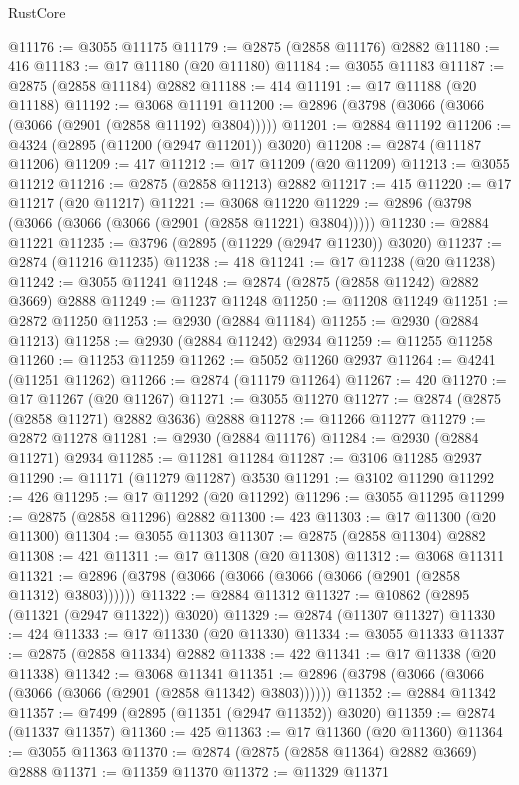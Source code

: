 \begin{lexlean}{RustCore}
\begin{coremodule}
@11176 := @3055 @11175
@11179 := @2875 (@2858 @11176) @2882
@11180 := 416
@11183 := @17 @11180 (@20 @11180)
@11184 := @3055 @11183
@11187 := @2875 (@2858 @11184) @2882
@11188 := 414
@11191 := @17 @11188 (@20 @11188)
@11192 := @3068 @11191
@11200 := @2896 (@3798 (@3066 (@3066 (@3066 (@2901 (@2858 @11192) @3804)))))
@11201 := @2884 @11192
@11206 := @4324 (@2895 (@11200 (@2947 @11201)) @3020)
@11208 := @2874 (@11187 @11206)
@11209 := 417
@11212 := @17 @11209 (@20 @11209)
@11213 := @3055 @11212
@11216 := @2875 (@2858 @11213) @2882
@11217 := 415
@11220 := @17 @11217 (@20 @11217)
@11221 := @3068 @11220
@11229 := @2896 (@3798 (@3066 (@3066 (@3066 (@2901 (@2858 @11221) @3804)))))
@11230 := @2884 @11221
@11235 := @3796 (@2895 (@11229 (@2947 @11230)) @3020)
@11237 := @2874 (@11216 @11235)
@11238 := 418
@11241 := @17 @11238 (@20 @11238)
@11242 := @3055 @11241
@11248 := @2874 (@2875 (@2858 @11242) @2882 @3669) @2888
@11249 := @11237 @11248
@11250 := @11208 @11249
@11251 := @2872 @11250
@11253 := @2930 (@2884 @11184)
@11255 := @2930 (@2884 @11213)
@11258 := @2930 (@2884 @11242) @2934
@11259 := @11255 @11258
@11260 := @11253 @11259
@11262 := @5052 @11260 @2937
@11264 := @4241 (@11251 @11262)
@11266 := @2874 (@11179 @11264)
@11267 := 420
@11270 := @17 @11267 (@20 @11267)
@11271 := @3055 @11270
@11277 := @2874 (@2875 (@2858 @11271) @2882 @3636) @2888
@11278 := @11266 @11277
@11279 := @2872 @11278
@11281 := @2930 (@2884 @11176)
@11284 := @2930 (@2884 @11271) @2934
@11285 := @11281 @11284
@11287 := @3106 @11285 @2937
@11290 := @11171 (@11279 @11287) @3530
@11291 := @3102 @11290
@11292 := 426
@11295 := @17 @11292 (@20 @11292)
@11296 := @3055 @11295
@11299 := @2875 (@2858 @11296) @2882
@11300 := 423
@11303 := @17 @11300 (@20 @11300)
@11304 := @3055 @11303
@11307 := @2875 (@2858 @11304) @2882
@11308 := 421
@11311 := @17 @11308 (@20 @11308)
@11312 := @3068 @11311
@11321 := @2896 (@3798 (@3066 (@3066 (@3066 (@3066 (@2901 (@2858 @11312) @3803))))))
@11322 := @2884 @11312
@11327 := @10862 (@2895 (@11321 (@2947 @11322)) @3020)
@11329 := @2874 (@11307 @11327)
@11330 := 424
@11333 := @17 @11330 (@20 @11330)
@11334 := @3055 @11333
@11337 := @2875 (@2858 @11334) @2882
@11338 := 422
@11341 := @17 @11338 (@20 @11338)
@11342 := @3068 @11341
@11351 := @2896 (@3798 (@3066 (@3066 (@3066 (@3066 (@2901 (@2858 @11342) @3803))))))
@11352 := @2884 @11342
@11357 := @7499 (@2895 (@11351 (@2947 @11352)) @3020)
@11359 := @2874 (@11337 @11357)
@11360 := 425
@11363 := @17 @11360 (@20 @11360)
@11364 := @3055 @11363
@11370 := @2874 (@2875 (@2858 @11364) @2882 @3669) @2888
@11371 := @11359 @11370
@11372 := @11329 @11371

\end{coremodule}
\end{lexlean}
